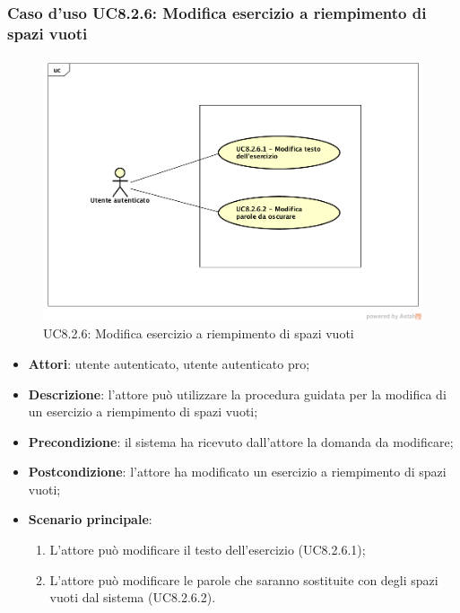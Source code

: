 \subsubsection{Caso d'uso UC8.2.6: Modifica esercizio a riempimento di spazi vuoti}
	\label{UC8.2.6}
	\begin{figure}[h]
		\centering
			\includegraphics[scale=0.45,keepaspectratio]{UML/UC8_2_6.png}
		\caption{UC8.2.6: Modifica esercizio a riempimento di spazi vuoti}
	\end{figure}
	\FloatBarrier
	\begin{itemize}
		\item
			\textbf{Attori}: utente autenticato, utente autenticato pro;
		\item		
			\textbf{Descrizione}: l'attore può utilizzare la procedura guidata per la modifica di un esercizio a riempimento di spazi vuoti;
		\item
			\textbf{Precondizione}: il sistema ha ricevuto dall'attore la domanda da modificare;
		\item
			\textbf{Postcondizione}: l'attore ha modificato un esercizio a riempimento di spazi vuoti;
		\item
			\textbf{Scenario principale}:
	       		\begin{enumerate}
	       			\item
	       			L'attore può modificare il testo dell'esercizio (UC8.2.6.1);
	       			\item
	       			L'attore può modificare le parole che saranno sostituite con degli spazi vuoti dal sistema (UC8.2.6.2).
	 			\end{enumerate}
	\end{itemize}
	
